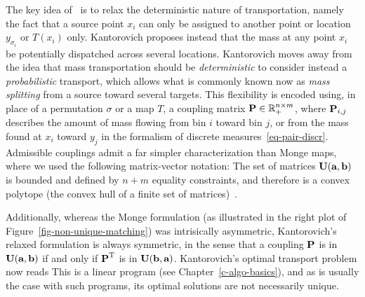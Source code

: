 The key idea of~\citet{Kantorovich42} is to relax the deterministic nature of transportation, namely the fact that a source point $x_i$ can only be assigned to another point or location $y_{\sigma_i}$ or $T(x_i)$ only. Kantorovich proposes instead that the mass at any point $x_i$ be potentially dispatched across several locations. Kantorovich moves away from the idea that mass transportation should be \emph{deterministic} to consider instead a \emph{probabilistic} transport, which allows what is commonly known now as \emph{mass splitting} from a source toward several targets. This flexibility is encoded using, in place of a permutation $\sigma$ or a map $T$, a coupling matrix $\P  \in \RR_+^{n \times m}$, where $\P_{i,j}$ describes the amount of mass flowing from bin $i$ toward bin $j$, or from the mass found at $x_i$ toward $y_j$ in the formalism of discrete measures~\eqref{eq-pair-discr}. Admissible couplings admit a far simpler characterization than Monge maps,
where we used the following matrix-vector notation:
The set of matrices $\CouplingsD(\a,\b)$ is bounded and defined by $n+m$ equality constraints, and therefore is a convex polytope (the convex hull of a finite set of matrices)~\citep[\S8.1]{brualdi2006combinatorial}.

%
Additionally, whereas the Monge formulation (as illustrated in the right plot of Figure~\ref{fig-non-unique-matching}) was intrisically asymmetric, Kantorovich's relaxed formulation is always symmetric, in the sense that a coupling $\P$ is in  $\CouplingsD(\a,\b)$ if and only if  $\transp{\P}$ is in $\CouplingsD(\b,\a)$. Kantorovich's optimal transport problem now reads
This is a linear program (see Chapter~\ref{c-algo-basics}), and as is usually the case with such programs, its optimal solutions are not necessarily unique.

